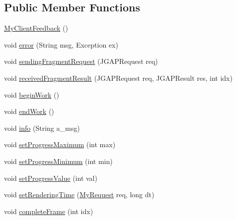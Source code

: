 \subsection*{Public Member Functions}
\begin{DoxyCompactItemize}
\item 
\hyperlink{classexamples_1_1grid_1_1fitness_distributed_1_1_my_client_feedback_ab376120496f17e82697314d405893a93}{My\-Client\-Feedback} ()
\item 
void \hyperlink{classexamples_1_1grid_1_1fitness_distributed_1_1_my_client_feedback_a129804ccdb021f327ed016d9a5acce02}{error} (String msg, Exception ex)
\item 
void \hyperlink{classexamples_1_1grid_1_1fitness_distributed_1_1_my_client_feedback_a91fed711a53cce7a2817c1db3b8d0ae9}{sending\-Fragment\-Request} (J\-G\-A\-P\-Request req)
\item 
void \hyperlink{classexamples_1_1grid_1_1fitness_distributed_1_1_my_client_feedback_ae1a096c0f6b6044ce547bd391ab5cc89}{received\-Fragment\-Result} (J\-G\-A\-P\-Request req, J\-G\-A\-P\-Result res, int idx)
\item 
void \hyperlink{classexamples_1_1grid_1_1fitness_distributed_1_1_my_client_feedback_a1f79c7c810e6b50663cba0e06fe8e03e}{begin\-Work} ()
\item 
void \hyperlink{classexamples_1_1grid_1_1fitness_distributed_1_1_my_client_feedback_acdeef6362b8b2b5aab313e8e58825bc6}{end\-Work} ()
\item 
void \hyperlink{classexamples_1_1grid_1_1fitness_distributed_1_1_my_client_feedback_ac44ef8af54e6752d3be4bccb909d3477}{info} (String a\-\_\-msg)
\item 
void \hyperlink{classexamples_1_1grid_1_1fitness_distributed_1_1_my_client_feedback_a910b7cdc0ceb4bd9b333bdf52ef724c0}{set\-Progress\-Maximum} (int max)
\item 
void \hyperlink{classexamples_1_1grid_1_1fitness_distributed_1_1_my_client_feedback_a257972392f5384ae561c0ada46a693cd}{set\-Progress\-Minimum} (int min)
\item 
void \hyperlink{classexamples_1_1grid_1_1fitness_distributed_1_1_my_client_feedback_aa5b06f80461d2849502aa8e053765967}{set\-Progress\-Value} (int val)
\item 
void \hyperlink{classexamples_1_1grid_1_1fitness_distributed_1_1_my_client_feedback_a0c62c6738475ffa74e4e5b761925d28b}{set\-Rendering\-Time} (\hyperlink{classexamples_1_1grid_1_1fitness_distributed_1_1_my_request}{My\-Request} req, long dt)
\item 
void \hyperlink{classexamples_1_1grid_1_1fitness_distributed_1_1_my_client_feedback_a3f2a7916ceb5d1d4973278e552618489}{complete\-Frame} (int idx)
\end{DoxyCompactItemize}
